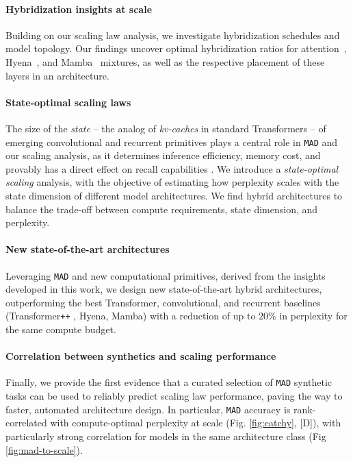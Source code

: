 \paragraph{Hybridization insights at scale}

Building on our scaling law analysis, we investigate hybridization schedules and model topology. Our findings uncover optimal hybridization ratios for attention~\cite{vaswani2017attention}, Hyena~\cite{poli2023hyena}, and Mamba~\cite{gu2023mamba} mixtures, as well as the respective placement of these layers in an architecture. 

\paragraph{State-optimal scaling laws}

The size of the \textit{state} -- the analog of \textit{kv-caches} in standard Transformers \cite{massaroli2023laughing} -- of emerging convolutional and recurrent primitives \cite{poli2023hyena,gu2023mamba} plays a central role in {\tt MAD} and our scaling analysis, as it determines inference efficiency, memory cost, and provably has a direct effect on recall capabilities \cite{arora2023zoology}. We introduce a \textit{state-optimal scaling} analysis, with the objective of estimating how perplexity scales with the state dimension of different model architectures. We find hybrid architectures to balance the trade-off between compute requirements, state dimension, and perplexity.

\paragraph{New state-of-the-art architectures}

Leveraging {\tt MAD} and new computational primitives, derived from the insights developed in this work, we design new state-of-the-art hybrid architectures, outperforming the best Transformer, convolutional, and recurrent baselines (Transformer{\tt ++} \cite{touvron2023llama}, Hyena, Mamba) with a reduction of up to $20\%$ in perplexity for the same compute budget.

\paragraph{Correlation between synthetics and scaling performance}

Finally, we provide the first evidence that a curated selection of {\tt MAD} synthetic tasks can be used to reliably predict scaling law performance, paving the way to faster, automated architecture design. In particular, {\tt MAD} accuracy is rank-correlated with compute-optimal perplexity at scale (Fig. \ref{fig:catchy}, [D]), with particularly strong correlation for models in the same architecture class (Fig \ref{fig:mad-to-scale}). 

